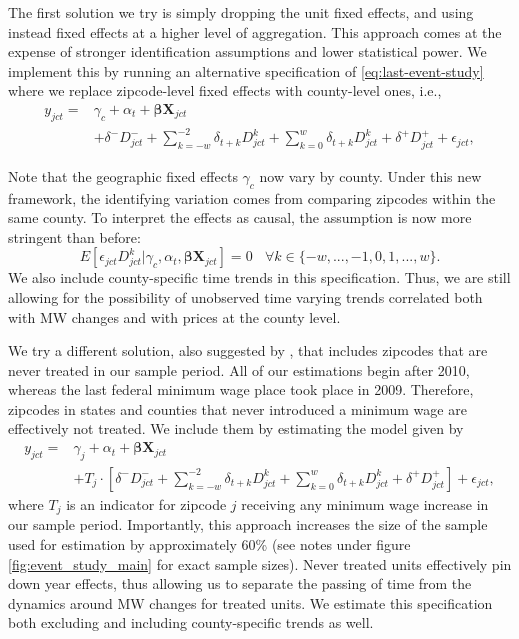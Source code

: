    The first solution we try is simply dropping the unit fixed effects, and using instead fixed effects at a higher level of aggregation. This approach comes at the expense of stronger identification assumptions and lower statistical power. We implement this by running an alternative specification of \eqref{eq:last-event-study} where we replace zipcode-level fixed effects with county-level ones, i.e.,
    \begin{equation}\label{eq:last-event-study-countyFE}
        \begin{split}
            y_{jct} = & \gamma_{c} + \alpha_{t} + \boldsymbol{\beta} \boldsymbol{X}_{jct} \\
            & + \delta^{-} D_{jct}^{-} + \sum\limits_{k = -w}^{-2}\delta_{t + k}D_{jct}^k + \sum\limits_{k = 0}^{w}\delta_{t + k} D_{jct}^k + \delta^{+} D_{jct}^{+} + \epsilon_{jct} ,
        \end{split}   
    \end{equation}
    
    Note that the geographic fixed effects $\gamma_{c}$ now vary by county. Under this new framework, the identifying variation comes from comparing zipcodes within the same county. To interpret the effects as causal, the assumption is now more stringent than before: $$E \left[ \epsilon_{jct} D_{jct}^k | \gamma_c, \alpha_{t}, \boldsymbol{\beta} \boldsymbol{X}_{jct}\right]  = 0 \  \ \ \ \forall k\in\{-w, ..., -1, 0, 1, ..., w\} .$$ We also include county-specific time trends in this specification. Thus, we are still allowing for the possibility of unobserved time varying trends correlated both with MW changes and with prices at the county level.
    
    We try a different solution, also suggested by \textcite{BorusyakJaravel2017}, that includes zipcodes that are never treated in our sample period. All of our estimations begin after 2010, whereas the last federal minimum wage place took place in 2009. Therefore, zipcodes in states and counties that never introduced a minimum wage are effectively not treated. We include them by estimating the model given by
    \begin{equation}\label{eq:last-event-study-control}
        \begin{split}
            y_{jct} = & \gamma_{j} + \alpha_{t} + \boldsymbol{\beta} \boldsymbol{X}_{jct} \\
            & + T_j\cdot\left[\delta^{-} D_{jct}^{-} + \sum\limits_{k = -w}^{-2}\delta_{t + k}D_{jct}^k + \sum\limits_{k = 0}^{w}\delta_{t + k} D_{jct}^k + \delta^{+} D_{jct}^{+}\right] + \epsilon_{jct} , 
        \end{split}   
    \end{equation}
    where $T_j$ is an indicator for zipcode $j$ receiving any minimum wage increase in our sample period. Importantly, this approach increases the size of the sample used for estimation by approximately 60\% (see notes under figure \ref{fig:event_study_main} for exact sample sizes). Never treated units effectively pin down year effects, thus allowing us to separate the passing of time from the dynamics around MW changes for treated units. We estimate this specification both excluding and including county-specific trends as well.
    
